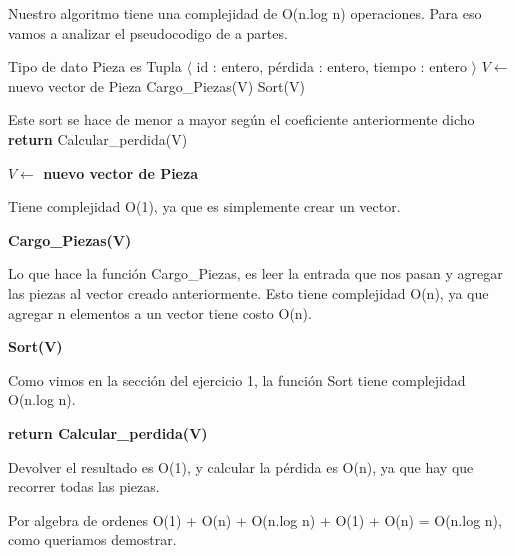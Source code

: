 Nuestro algoritmo tiene una complejidad de O(n.log n) operaciones. Para eso vamos a analizar el pseudocodigo de a partes.

\begin{pseudo}
\State Tipo de dato Pieza es Tupla $\langle$ id : entero, pérdida : entero, tiempo : entero $\rangle$
        \State $V \leftarrow$ nuevo vector de Pieza 
        \State Cargo\_Piezas(V) 
        \State Sort(V) 
        
        \Comment Este sort se hace de menor a mayor según el coeficiente anteriormente dicho
        \State \textbf{return} Calcular\_perdida(V) 
    \EndProcedure
\end{pseudo}

\begin{pseudo}
 \State  \textbf{$V \leftarrow$ nuevo vector de Pieza}
\end{pseudo}

Tiene complejidad O(1), ya que es simplemente crear un vector.

\begin{pseudo}
 \State \textbf{Cargo\_Piezas(V)}
\end{pseudo}

Lo que hace la función Cargo\_Piezas, es leer la entrada que nos pasan y agregar las piezas al vector creado anteriormente. Esto tiene complejidad O(n), ya que agregar n elementos a un vector tiene costo O(n).

\begin{pseudo}
 \State \textbf{Sort(V)}
\end{pseudo}

Como vimos en la sección del ejercicio 1, la función Sort tiene complejidad O(n.log n).

\begin{pseudo}
 \State \textbf{return Calcular\_perdida(V)}
\end{pseudo}

Devolver el resultado es O(1), y calcular la pérdida es O(n), ya que hay que recorrer todas las piezas.

Por algebra de ordenes O(1) + O(n) + O(n.log n) + O(1) + O(n) = O(n.log n), como queriamos demostrar.